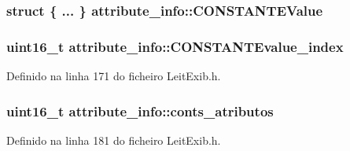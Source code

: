 \hypertarget{structattribute__info_ad720b5734bfd063b84a4348b4f246dd9}{
\subsubsection[{C\-O\-N\-S\-T\-A\-N\-T\-E\-Value}]{\setlength{\rightskip}{0pt plus 5cm}struct \{ ... \}   attribute\-\_\-info\-::\-C\-O\-N\-S\-T\-A\-N\-T\-E\-Value}}\label{structattribute__info_ad720b5734bfd063b84a4348b4f246dd9}
\hypertarget{structattribute__info_aaf7c878962dc6671915725990a8152ef}{
\subsubsection[{C\-O\-N\-S\-T\-A\-N\-T\-Evalue\-\_\-index}]{\setlength{\rightskip}{0pt plus 5cm}uint16\-\_\-t attribute\-\_\-info\-::\-C\-O\-N\-S\-T\-A\-N\-T\-Evalue\-\_\-index}}\label{structattribute__info_aaf7c878962dc6671915725990a8152ef}


Definido na linha 171 do ficheiro Leit\-Exib.\-h.

\hypertarget{structattribute__info_add66058b51a906097b01d2f4695f4d9a}{
\subsubsection[{conts\-\_\-atributos}]{\setlength{\rightskip}{0pt plus 5cm}uint16\-\_\-t attribute\-\_\-info\-::conts\-\_\-atributos}}\label{structattribute__info_add66058b51a906097b01d2f4695f4d9a}


Definido na linha 181 do ficheiro Leit\-Exib.\-h.

